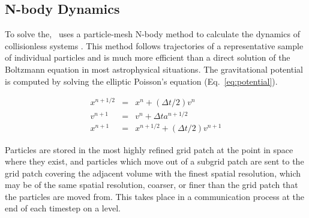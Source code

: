 \subsection{N-body Dynamics}
\label{sec.ov.nbody}


To solve the, \enzo\ uses a particle-mesh N-body method to calculate 
the dynamics of collisionless systems \citep{Hockney88}.  This method 
follows trajectories 
of a representative sample of individual particles and is much more 
efficient than a direct solution of the Boltzmann equation in most 
astrophysical situations. 
The gravitational potential is computed by solving the elliptic 
Poisson's equation (Eq.~\ref{eq:potential}).

\begin{eqnarray}
\label{eqn.driftkick}
x^{n+1/2} & = & x^n + (\Delta t/2) v^{n} \nonumber \\
v^{n+1} & = & v^n + \Delta t a^{n+1/2} \\
x^{n+1} & = & x^{n+1/2} + (\Delta t/2) v^{n+1} \nonumber
\end{eqnarray}



Particles are stored in the most highly refined grid patch at the point in space where they exist, and particles which move out of a subgrid patch are sent to the grid patch covering the adjacent volume with the finest spatial resolution, which may be of the same spatial resolution, coarser, or finer than the grid patch that the particles are moved from.  This takes place in a communication process at the end of each timestep on a level.

